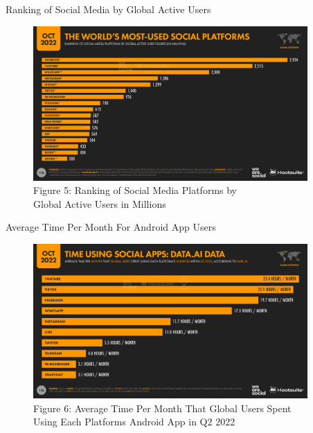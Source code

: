 \documentclass[pdf]{beamer}
\theoremstyle{remark}
\theoremstyle{definition}
\begin{document}
\begin{frame}[t]{Ranking of Social Media by Global Active Users}
\begin{figure}[htbp]
  \captionsetup{justification=centering}
  \includegraphics[height=5.9cm, trim=0.0cm 0.0cm 0.0cm 0.0cm width=5.9cm]{Images/Hootsuite_SocialMedia_1022_1.png}
  \caption{Figure {\color{franklinblue} 5}: Ranking of Social Media Platforms by  \\ Global Active Users in Millions}
\end{figure}
\end{frame}

\begin{frame}[t]{Average Time Per Month For Android App Users}
\begin{figure}[htbp]
  \captionsetup{justification=centering}
  \includegraphics[height=5.9cm, trim=0.0cm 0.0cm 0.0cm 0.0cm width=5.9cm]{Images/Hootsuite_SocialMedia_1022_2.png}
  \caption{Figure {\color{franklinblue} 6}: Average Time Per Month That Global Users Spent \\ Using Each Platforms Android App in Q2 2022}
\end{figure}
\end{frame}
\end{document}
